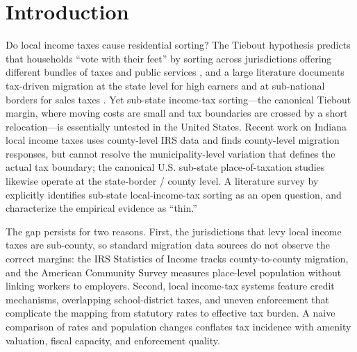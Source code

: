 \documentclass[12pt]{article}
\begin{document}
\section{Introduction}
\label{sec:intro}

Do local income taxes cause residential sorting? The Tiebout
hypothesis predicts that households ``vote with their feet'' by
sorting across jurisdictions offering different bundles of taxes and
public services \citep{tiebout1956}, and a large literature
documents tax-driven migration at the state level for high earners
\citep{kleven2020, young2016, morettiEffectStateTaxes2017} and at sub-national
borders for sales taxes \citep{agrawal2015gradient}. Yet sub-state
income-tax sorting---the canonical Tiebout margin, where moving
costs are small and tax boundaries are crossed by a short
relocation---is essentially untested in the United States. Recent
work on Indiana local income taxes
\citep{yangRESPONSIVENESSINCOMELOCAL2017} uses county-level IRS
data and finds county-level migration responses, but cannot
resolve the municipality-level variation that defines the actual tax
boundary; the canonical U.S. sub-state place-of-taxation studies
\citep{coomes2008,rohlinTaxAvoidanceBusiness2014} likewise operate
at the state-border / county level. A literature survey
by \citet{agrawalLessonsStateLocal} explicitly identifies sub-state
local-income-tax sorting as an open question, and
\citet{agrawalLocalPolicyChoice2022} characterize the empirical
evidence as ``thin.''

The gap persists for two reasons. First, the jurisdictions that
levy local income taxes are sub-county, so standard migration data
sources do not observe the correct margins: the IRS Statistics of
Income tracks county-to-county migration, and the American
Community Survey measures place-level population without linking
workers to employers. Second, local income-tax systems feature
credit mechanisms, overlapping school-district taxes, and uneven
enforcement that complicate the mapping from statutory rates to
effective tax burden. A naive comparison of rates and population
changes conflates tax incidence with amenity valuation, fiscal
capacity, and enforcement quality.
\end{document}
